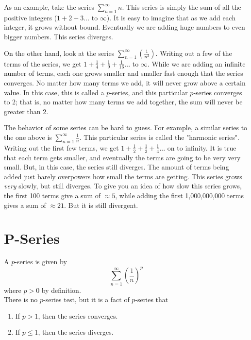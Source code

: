 \documentclass[12pt]{report}
\begin{document}
As an example, take the series $ \sum_{n=1}^{\infty} n $. This series is simply the sum of all the positive integers ($1 + 2 + 3...$ to $\infty$). It is easy to imagine that as we add each integer, it grows without bound. Eventually we are adding huge numbers to even bigger numbers. This series diverges.

On the other hand, look at the series $ \sum_{n=1}^{\infty} \left( \frac{1}{n^2} \right) $. Writing out a few of the terms of the series, we get $ 1 + \frac{1}{4} + \frac{1}{9} + \frac{1}{16} ...$ to $ \infty $. While we are adding an infinite number of terms, each one grows smaller and smaller fast enough that the series converges. No matter how many terms we add, it will never grow above a certain value. In this case, this is called a $p$-series, and this particular $p$-series converges to 2; that is, no matter how many terms we add together, the sum will never be greater than 2.

The behavior of some series can be hard to guess. For example, a similar series to the one above is $ \sum_{n=1}^{\infty} \frac{1}{n} $. This particular series is called the "harmonic series". Writing out the first few terms, we get $ 1 + \frac{1}{2} + \frac{1}{3} + \frac{1}{4} ... $ on to infinity. It is true that each term gets smaller, and eventually the terms are going to be very very small. But, in this case, the series still diverges. The amount of terms being added just barely overpowers how small the terms are getting. This series grows \textit{very} slowly, but still diverges. To give you an idea of how slow this series grows, the first 100 terms give a sum of $ \approx 5 $, while adding the first 1,000,000,000 terms gives a sum of $ \approx 21 $. But it is still divergent.


\clearpage




\section{P-Series}
A $p$-series is given by
	$$\sum_{n=1}^{\infty} \left( \frac{1}{n} \right)^p$$
where $p > 0$ by definition. \\


\noindent There is no $p$-series test, but it is a fact of $p$-series that
\begin{enumerate}
	\item If $p > 1$, then the series converges.
	\item If $p \leq 1$, then the series diverges.
\end{enumerate}
\end{document}
